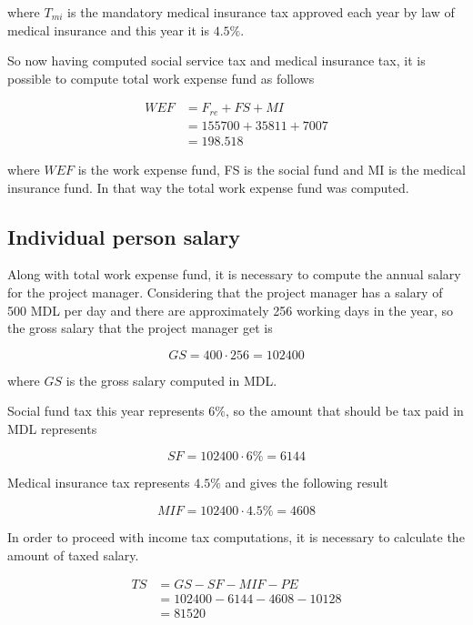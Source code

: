 \noindent
where $T_{mi}$ is the mandatory medical insurance tax approved each year by law of medical insurance and this year it is $4.5\%$. 

So now having computed social service tax and medical insurance tax, it is possible to compute total work expense fund as follows

\begin{equation}
\begin{split}
 WEF &= F_{re} + FS + MI\\
     &= 155700 + 35811 + 7007\\
     &= 198.518
\end{split}
\end{equation}

\noindent
where $WEF$ is the work expense fund, FS is the social fund and MI is the medical insurance fund. In that way the total work expense fund was computed.


\subsection{Individual person salary}
Along with total work expense fund, it is necessary to compute the annual salary for the project manager. Considering that the project manager has a salary of 500 MDL per day and there are approximately 256 working days in the year, so the gross salary that the project manager get is

\begin{equation}
 GS = 400 \cdot 256 = 102400
\end{equation}

\noindent where $GS$ is the gross salary computed in MDL.

Social fund tax this year represents $6\%$, so the amount that should be tax paid in MDL represents

\begin{equation}
 SF = 102400 \cdot 6\% = 6144
\end{equation}

Medical insurance tax represents $4.5\%$ and gives the following result

\begin{equation}
 MIF = 102400 \cdot 4.5\% = 4608
\end{equation}

In order to proceed with income tax computations, it is necessary to calculate the amount of taxed salary.

\begin{equation}
\begin{split}
 TS &= GS - SF - MIF - PE \\
              &= 102400 - 6144 - 4608 - 10128\\ 
              &= 81520
\end{split}
\end{equation}

